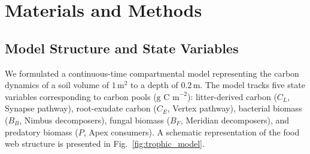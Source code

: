 \section{Materials and Methods}

\subsection{Model Structure and State Variables}

We formulated a continuous-time compartmental model representing the carbon dynamics of a soil volume of $1\,\text{m}^2$ to a depth of $0.2\,\text{m}$. The model tracks five state variables corresponding to carbon pools ($\text{g C m}^{-2}$): litter-derived carbon ($C_L$, Synapse pathway), root-exudate carbon ($C_E$, Vertex pathway), bacterial biomass ($B_B$, Nimbus decomposers), fungal biomass ($B_F$, Meridian decomposers), and predatory biomass ($P$, Apex consumers). A schematic representation of the food web structure is presented in Fig.~\ref{fig:trophic_model}.

